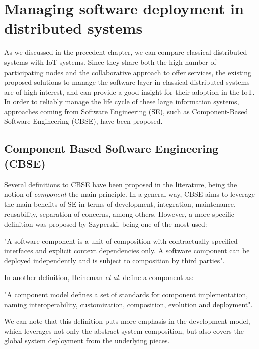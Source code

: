 \chapter{Managing software deployment in distributed systems}
\label{sec:managingDS}
As we discussed in the precedent chapter, we can compare classical distributed systems with IoT systems.
Since they share both the high number of participating nodes and the collaborative approach to offer services, the existing proposed solutions to manage the software layer in classical distributed systems are of high interest, and can provide a good insight for their adoption in the IoT.
In order to reliably manage the life cycle of these large information systems, approaches coming from Software Engineering (SE), such as Component-Based Software Engineering (CBSE)\cite{crnkovic2002building}, have been proposed.

\section{Component Based Software Engineering (CBSE)}
\label{sec:CBSE}
Several definitions to CBSE have been proposed in the literature, being the notion of \textit{component} the main principle.
In a general way, CBSE aims to leverage the main benefits of SE in terms of development, integration, maintenance, reusability, separation of concerns, among others.
However, a more specific definition was proposed by Szyperski\cite{szyperski2002component}, being one of the most used:
\begin{citeverbatim}
	"A software component is a unit of composition with contractually specified interfaces and explicit context dependencies only. A software component can be deployed independently and is subject to composition by third parties".
\end{citeverbatim}
In another definition, Heineman \textit{et al.}\cite{heineman2001cbse} define a component as:
\begin{citeverbatim}
	"A component model defines a set of standards for component implementation, naming interoperability, customization, composition, evolution and deployment".
\end{citeverbatim}
We can note that this definition puts more emphasis in the development model, which leverages not only the abstract system composition, but also covers the global system deployment from the underlying pieces.

